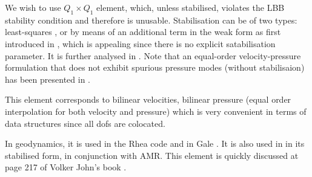 


We wish to use $Q_1 \times Q_1$ element, which, unless stabilised,
violates  the LBB stability condition and therefore is unusable. 
Stabilisation can be of two types: least-squares \cite{dohu03,temr92,kibr12,gubl07},
or by means of an additional term in the weak form as first introduced in \cite{dobo04,bodg06}, 
which is appealing since there is no explicit satabilisation parameter.
It is further analysed in \cite{nosi01,lihc09,hufb86,shry78,grcc95}.
Note that an equal-order velocity-pressure formulation that does not exhibit spurious
pressure modes (without stabilisaion) has been presented in \cite{risc86}.

This element corresponds to bilinear velocities, bilinear pressure 
(equal order interpolation for both velocity and pressure) which is 
very convenient in terms of data structures since all dofs are colocated.

In geodynamics, it is used in the Rhea code \cite{stgb10,busa13} and in Gale \cite{arbi13}.
It is also used in \cite{lezh11} in its stabilised form, in conjunction with AMR. 
This element is quickly discussed at page 217 of Volker John's book \cite{john16}.

